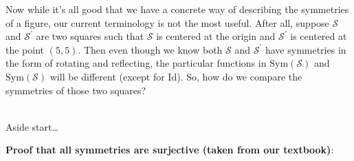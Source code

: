 \documentclass{book}
\newcommand{\blab}[1]{\textbf{#1}}
\newcommand{\Sym}{\mathrm{Sym}}
\newcommand{\myId}{\mathrm{Id}}
\newcommand{\mySepTwo}[1][.]{%
   {\noindent\color{#1}{\rule{6.5in}{0.5mm}}}\\%
}
\newcommand{\retTwo}{\hfill\bigbreak}
\begin{document}
Now while it's all good that we have a concrete way of describing the symmetries of a figure, our current terminology is not the most useful. After all, suppose $\mathcal{S}$ and $\mathcal{S}^\prime$ are two squares such that $\mathcal{S}$ is centered at the origin and $\mathcal{S}^\prime$ is centered at the point $(5, 5)$. Then even though we know both $\mathcal{S}$ and $\mathcal{S}^\prime$ have symmetries in the form of rotating and reflecting, the particular functions in $\Sym(\mathcal{S})$ and $\Sym(\mathcal{S})$ will be different (except for $\myId$). So, how do we compare the symmetries of those two squares?\retTwo

\mySepTwo

Aside start\dots\retTwo

\blab{Proof that all symmetries are surjective (taken from our textbook)}:\\
\end{document}
